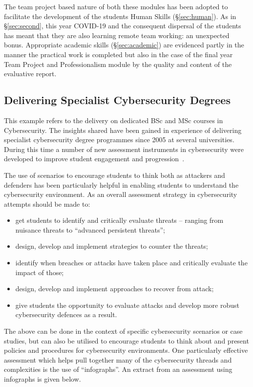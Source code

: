 \documentclass[conference]{IEEEtran}
\begin{document}
The team project based nature of both these modules has been adopted
to facilitate the development of the students Human Skills
(\S\ref{sec:human}). As in \S\ref{sec:second}, this year COVID-19 and
the consequent dispersal of the students has meant that they are also
learning remote team working: an unexpected bonus. Appropriate
academic skills (\S\ref{sec:academic}) are evidenced partly in the
manner the practical work is completed but also in the case of the
final year Team Project and Professionalism module by the quality and
content of the evaluative report.

\subsection{Delivering Specialist Cybersecurity Degrees}\label{sec:fourth} %
This example refers to the delivery on dedicated BSc and MSc courses
in Cybersecurity. The insights shared have been gained in experience
of delivering specialist cybersecurity degree programmes since 2005 at
several universities. During this time a number of new assessment
instruments in cybersecurity were developed to improve student
engagement and progression~\cite{Irons2019a}.

The use of scenarios to encourage students to think both as attackers and defenders has been particularly helpful in enabling students to understand the cybersecurity environment. As an overall assessment strategy in cybersecurity attempts should be made to: 
\begin{itemize}
\item get students to identify and critically evaluate threats – ranging from nuisance threats to “advanced persistent threats”;
\item design, develop and implement strategies to counter the threats;
\item identify when breaches or attacks have taken place and critically evaluate the impact of those;
\item design, develop and implement approaches to recover from attack;
\item give students the opportunity to evaluate attacks and develop more robust cybersecurity defences as a result.
\end{itemize}

The above can be done in the context of specific cybersecurity
scenarios or case studies, but can also be utilised to encourage
students to think about and present policies and procedures for
cybersecurity environments. One particularly effective assessment
which helps pull together many of the cybersecurity threads and
complexities is the use of ``infographs''. An extract from an
assessment using infographs is given below.
\end{document}
